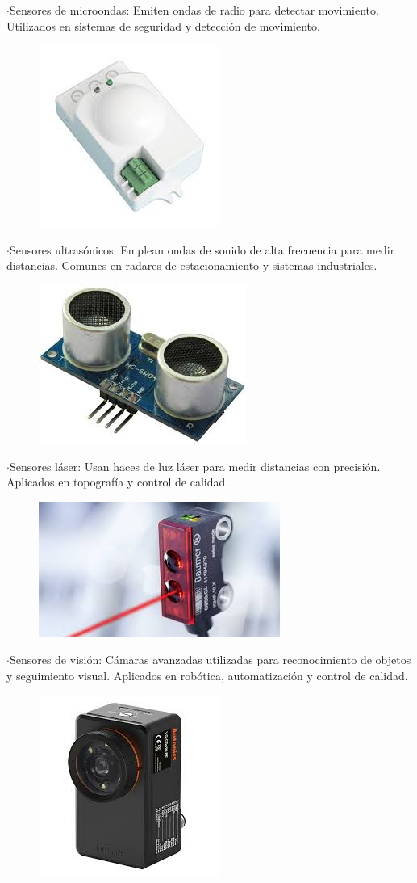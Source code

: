 	$\cdot$Sensores de microondas: Emiten ondas de radio para detectar movimiento. Utilizados en sistemas de seguridad y detección de movimiento.
	
	
\begin{figure} [h]
	\centering
	\includegraphics[width=0.3\linewidth]{img/sensormicroondas}
	\caption{}
	\label{fig:sensormicroondas}
\end{figure}
	
	
	$\cdot$Sensores ultrasónicos: Emplean ondas de sonido de alta frecuencia para medir distancias. Comunes en radares de estacionamiento y sistemas industriales.
	
	
\begin{figure} [h]
	\centering
	\includegraphics[width=0.3\linewidth]{img/sensorultrasonico}
	\caption{}
	\label{fig:sensorultrasonico}
\end{figure}
	
\newpage
	$\cdot$Sensores láser: Usan haces de luz láser para medir distancias con precisión. Aplicados en topografía y control de calidad.
	
	
\begin{figure} [h]
	\centering
	\includegraphics[width=0.3\linewidth]{img/sensorlaser}
	\caption{}
	\label{fig:sensorlaser}
\end{figure}

	$\cdot$Sensores de visión: Cámaras avanzadas utilizadas para reconocimiento de objetos y seguimiento visual. Aplicados en robótica, automatización y control de calidad.
	
	
\begin{figure} [h]
	\centering
	\includegraphics[width=0.3\linewidth]{img/sensorvision}
	\caption{}
	\label{fig:sensorvision}
\end{figure}
\newpage

